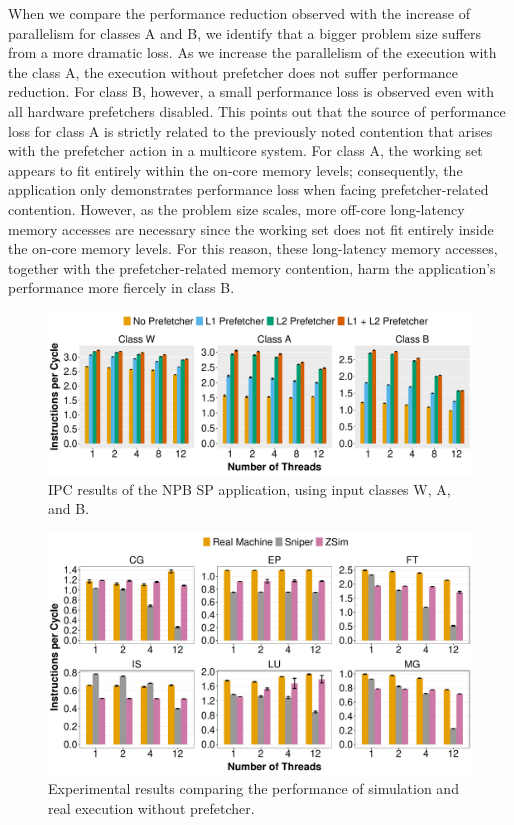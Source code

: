 \documentclass[AMA,final,STIX1COL]{WileyNJD-v2}
\begin{document}
When we compare the performance reduction observed with the increase of parallelism for classes A and B, we identify that a bigger problem size suffers from a more dramatic loss.
As we increase the parallelism of the execution with the class A, the execution without prefetcher does not suffer performance reduction.
For class B, however, a small performance loss is observed even with all hardware prefetchers disabled.
This points out that the source of performance loss for class A is strictly related to the previously noted contention that arises with the prefetcher action in a multicore system.
For class A, the working set appears to fit entirely within the on-core memory levels; consequently, the application only demonstrates performance loss when facing prefetcher-related contention.
However, as the problem size scales, more off-core long-latency memory accesses are necessary since the working set does not fit entirely inside the on-core memory levels.
For this reason, these long-latency memory accesses, together with the prefetcher-related memory contention, harm the application's performance more fiercely in class B.


\begin{figure}
    \centering
    \includegraphics[width=\linewidth]{figures/fig6.pdf}
    \caption{IPC results of the NPB SP application, using input classes W, A, and B.}
    \label{fig:nas_wab}
\end{figure}





\begin{figure}[b]
    \centering
    \includegraphics[width=\linewidth]{figures/fig8.pdf}
    \caption{Experimental results comparing the performance of simulation and real execution without prefetcher.}
    \label{fig:sims_nopref}
\end{figure}
\end{document}
